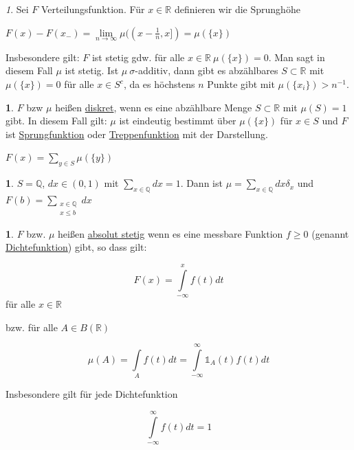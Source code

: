 \documentclass[10pt,a4paper]{report}
\newcommand{\R}{\mathbb{R}}
\numberwithin{equation}{section}
\numberwithin{figure}{section}
\theoremstyle{plain}
\theoremstyle{definition}
\newtheorem{defn}[thm]{\protect\definitionname}
\newtheorem{example}[thm]{\protect\examplename}
\theoremstyle{remark}
\newtheorem{rem}[thm]{\protect\remarkname}
\theoremstyle{plain}
\providecommand{\definitionname}{Definition}
\providecommand{\examplename}{Beispiel}
\providecommand{\remarkname}{Bemerkung}
\newcommand{\1}{ \mathbb{1} } %
\begin{document}
\begin{rem} 
  Sei $F$ Verteilungsfunktion. Für $x \in \R$ definieren wir die
  Sprunghöhe
  \begin{center}
    $F(x)-F(x_-)=\lim\limits_{n \to \infty}
    \mu((x-\frac{1}{n},x])=\mu(\{x\})$
  \end{center}
  Insbesondere gilt: $F$ ist stetig gdw. für alle $x \in \R ~ \mu(\{x\})=0$.
  Man sagt in diesem Fall $\mu$ ist stetig.
  Ist $\mu~ \sigma$-additiv, dann gibt es abzählbares $S \subset \R$ mit $\mu(\{x\})=0$ für alle $x \in S^c$, da es höchstens $n$ Punkte gibt mit $\mu(\{x_i\})>n^{-1}$. 
\end{rem}
\begin{defn}   
  $F$ bzw $\mu$ heißen \underline{diskret}, wenn es eine abzählbare
  Menge $S \subset \R$ mit $\mu(S)=1$ gibt. In diesem Fall gilt: $\mu$
  ist eindeutig bestimmt über $\mu(\{x\})$ für $x \in S$ und $F$ ist
  \underline{Sprungfunktion} oder \underline{Treppenfunktion} mit der
  Darstellung.
  \begin{center}
    $F(x)=\sum\limits_{y \in S} \mu(\{y\})$
  \end{center}
\end{defn}
\begin{example}
  $S=\mathbb{Q}$, $dx \in (0,1)$ mit $\sum\limits_{x \in \mathbb{Q}} dx=1$. 
  Dann ist $\mu=\sum\limits_{x \in \mathbb{Q} }dx\delta_x$ und $F(b)=\sum\limits_{\substack{x \in \mathbb{Q}\\ x \leq b}} dx$
\end{example}
\begin{defn} 
  $F$ bzw. $\mu$ heißen \underline{absolut stetig} wenn es eine
  messbare Funktion $f\geq 0$ (genannt \underline{Dichtefunktion})
  gibt, so dass gilt:
  \begin{center}
    \[F(x)=\int\limits_{-\infty}^xf(t)dt\] für alle $x \in \R$
  \end{center}
  bzw. für alle $A \in B(\R)$
  \begin{center}
    \[\mu(A)=\int\limits_A f(t) dt=\int\limits_{-\infty}^\infty
    \1_A(t)f(t)dt\]
  \end{center}
  Insbesondere gilt für jede Dichtefunktion
  \begin{center}
    \[\int\limits_{-\infty}^\infty f(t)dt=1\]
  \end{center}
\end{defn}
\end{document}
